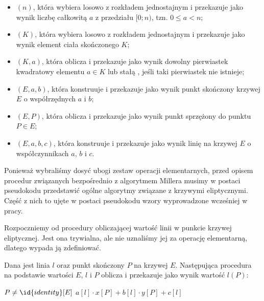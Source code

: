 \begin{remark}
\begin{itemize}
\begin{itemize}
\item {}$(n)$, 
która wybiera losowo z rozkładem jednostajnym i przekazuje jako wynik
liczbę całkowitą $a$ z przedziału $[0; n)$, tzn. $0 \leq a < n$;
\item {}$(K)$,
która wybiera losowo z rozkładem jednostajnym i przekazuje jako wynik
element ciała skończonego $K$;
\item {}$(K, a)$,
która oblicza i przekazuje jako wynik
dowolny pierwiastek kwadratowy elementu $a \in K$
lub stałą , jeśli taki pierwiastek nie istnieje;
\item {}$(E, a, b)$,
która konstruuje i przekazuje jako wynik
punkt skończony krzywej $E$ o współrzędnych $a$ i $b$;
\item {}$(E, P)$,
która oblicza i przekazuje jako wynik
punkt sprzężony do punktu $P \in E$;
\item {}$(E, a, b, c)$,
która konstruuje i przekazuje jako wynik
linię na krzywej $E$ o współczynnikach $a$, $b$ i $c$.
\end{itemize}
\end{itemize}
\end{remark}

\noindent
Ponieważ wybraliśmy dosyć ubogi zestaw operacji elementarnych,
przed opisem procedur związanych bezpośrednio z algorytmem Millera
musimy w postaci pseudokodu przedstawić
ogólne algorytmy związane z krzywymi eliptycznymi.
Część z nich to ujęte w postaci pseudokodu
wzory wyprowadzone wcześniej w pracy.

\noindent
Rozpoczniemy od procedury obliczającej
wartość linii w punkcie krzywej eliptycznej.
Jest ona trywialna, ale nie uznaliśmy jej za operację elementarną,
dlatego wypada ją zdefiniować.

\begin{algorithm}
Dana jest linia $l$ oraz punkt skończony $P$ na krzywej $E$.
Następująca procedura
na podstawie wartości $E$, $l$ i $P$
oblicza i przekazuje jako wynik
wartość $l(P)$:

\begin{codebox}
\li \Assert $P \neq \id{identity}[E]$
\li \Return $a[l]\cdot x[P] + b[l]\cdot y[P] + c[l]$
\end{codebox}
\end{algorithm}

